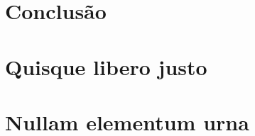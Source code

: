 
\lipsum[1]

\lipsum[2-3]



\chapter{Conclusão}

\lipsum[31-33]

\postextual %


%
%


\begin{apendicesenv}

\partapendices

\chapter{Quisque libero justo}

\lipsum[50]

\chapter{Nullam elementum urna}
\lipsum[55-57]

\end{apendicesenv}


